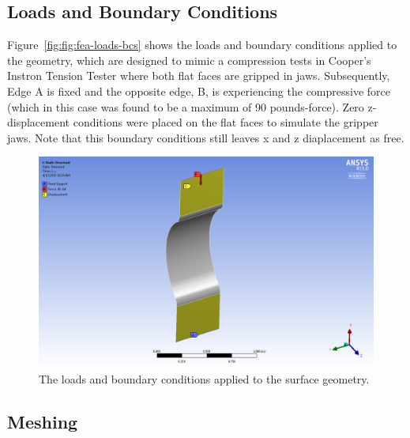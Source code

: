 \subsection{Loads and Boundary Conditions}

\indent

Figure~\ref{fig:fig:fea-loads-bcs} shows the loads and boundary conditions applied to the geometry, which are designed to mimic a compression tests in Cooper's Instron Tension Tester where both flat faces are gripped in jaws. Subsequently, Edge A is fixed and the opposite edge, B, is experiencing the compressive force (which in this case was found to be a maximum of 90 pounds-force). Zero z-displacement conditions were placed on the flat faces to simulate the gripper jaws. Note that this boundary conditions still leaves x and z diaplacement as free.\\

\begin{figure}[htp]
\centering
\includegraphics[width=1\textwidth]{./figures/fea/fea-mechanical-loads-bc}
\caption{The loads and boundary conditions applied to the surface geometry.}
\label{fig:fea-loads-bcs}
\end{figure}

\clearpage

\subsection{Meshing}

\indent

